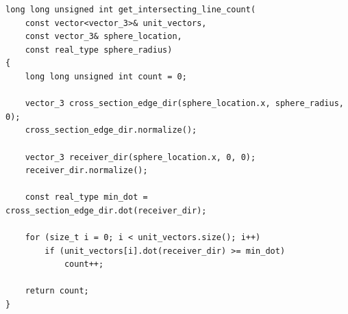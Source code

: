 \documentclass[12pt]{article}
\begin{document}
\begin{lstlisting}
long long unsigned int get_intersecting_line_count(
	const vector<vector_3>& unit_vectors,
	const vector_3& sphere_location,
	const real_type sphere_radius)
{
	long long unsigned int count = 0;

	vector_3 cross_section_edge_dir(sphere_location.x, sphere_radius, 0);
	cross_section_edge_dir.normalize();

	vector_3 receiver_dir(sphere_location.x, 0, 0);
	receiver_dir.normalize();

	const real_type min_dot = cross_section_edge_dir.dot(receiver_dir);

	for (size_t i = 0; i < unit_vectors.size(); i++)
		if (unit_vectors[i].dot(receiver_dir) >= min_dot)
			count++;

	return count;
}
\end{lstlisting}
\end{document}

